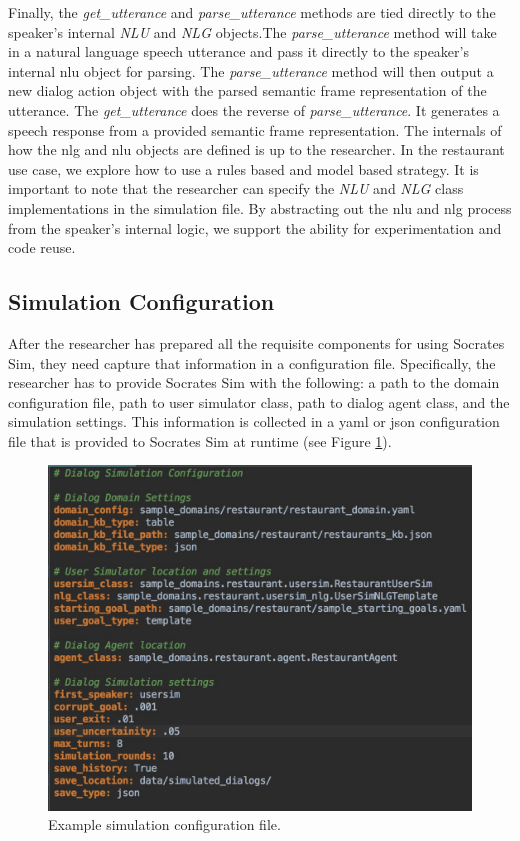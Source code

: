 Finally, the \textit{get\_utterance} and \textit{parse\_utterance} methods are tied directly to the speaker's internal \textit{NLU} and \textit{NLG} objects.The \textit{parse\_utterance} method will take in a natural language speech utterance and pass it directly to the speaker's internal nlu object for parsing. The \textit{parse\_utterance} method will then output a new dialog action object with the parsed semantic frame representation of the utterance. The \textit{get\_utterance} does the reverse of \textit{parse\_utterance}. It generates a speech response from a provided semantic frame representation. The internals of how the nlg and nlu objects are defined is up to the researcher. In the restaurant use case, we explore how to use a rules based and model based strategy. It is important to note that the researcher can specify the \textit{NLU} and \textit{NLG} class implementations in the simulation file. By abstracting out the nlu and nlg process from the speaker's internal logic, we support the ability for experimentation and code reuse. 

\subsection{Simulation Configuration}
After the researcher has prepared all the requisite components for using Socrates Sim, they need capture that information in a configuration file.  Specifically, the researcher has to provide Socrates Sim with the following: a path to the domain configuration file, path to user simulator class, path to dialog agent class, and the simulation settings. This information is collected in a yaml or json configuration file that is provided to Socrates Sim at runtime (see Figure \ref{fig:sample_sim_config}). 

\begin{figure}[h!]
	\centering
	\includegraphics[scale=.25]{diagrams/sample_sim_config.jpeg}
	\caption{ Example simulation configuration file. }
	\label{fig:sample_sim_config}
\end{figure}

